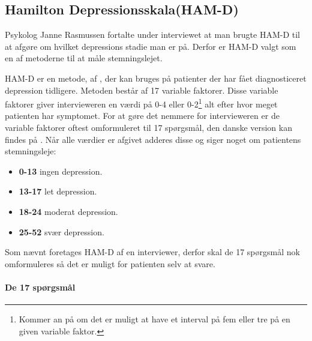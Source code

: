 \subsection{Hamilton Depressionsskala(HAM-D)}
Psykolog Janne Rasmussen fortalte under interviewet at man brugte HAM-D til at afgøre om hvilket depressions stadie man er på.\cite[Afsnit 1.3, Møde med Psykolog Janne Rasmussen]{faelles}
Derfor er HAM-D valgt som en af metoderne til at måle stemningslejet.

HAM-D er en metode, af \citet{ham_d}, der kan bruges på patienter der har fået diagnosticeret depression tidligere. 
Metoden består af 17 variable faktorer.
Disse variable faktorer giver intervieweren en værdi på 0-4 eller 0-2\footnote{Kommer an på om det er muligt at have et interval på fem eller tre på en given variable faktor.} alt efter hvor meget patienten har symptomet.
For at gøre det nemmere for intervieweren er de variable faktorer oftest omformuleret til 17 spørgsmål, den danske version kan findes på \citet{ham_d_dansk}.
Når alle værdier er afgivet adderes disse og siger noget om patientens stemningsleje:
\begin{itemize}
	\item \textbf{0-13} ingen depression.
	\item \textbf{13-17} let depression.
	\item \textbf{18-24} moderat depression.
	\item \textbf{25-52} svær depression.
\end{itemize}

Som nævnt foretages HAM-D af en interviewer, derfor skal de 17 spørgsmål nok omformuleres så det er muligt for patienten selv at svare.

\paragraph{De 17 spørgsmål}
